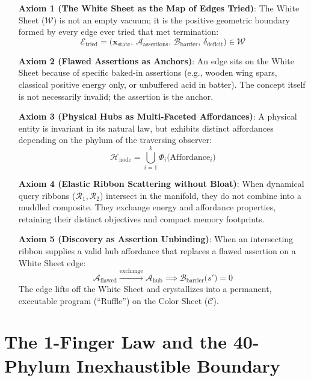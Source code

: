 \documentclass[11pt,a4paper]{article}
\begin{document}
\begin{itemize}
    \item[\textbf{Axiom 1 (The White Sheet as the Map of Edges Tried)}:] The White Sheet ($\mathcal{W}$) is not an empty vacuum; it is the positive geometric boundary formed by every edge ever tried that met termination:
    \begin{equation}
        \mathcal{E}_{\text{tried}} = \big(\mathbf{x}_{\text{state}}, \,\mathcal{A}_{\text{assertions}}, \,\mathcal{B}_{\text{barrier}}, \,\delta_{\text{deficit}}\big) \in \mathcal{W}
    \end{equation}
    \item[\textbf{Axiom 2 (Flawed Assertions as Anchors)}:] An edge sits on the White Sheet because of specific baked-in assertions (e.g., wooden wing spars, classical positive energy only, or unbuffered acid in batter). The concept itself is not necessarily invalid; the assertion is the anchor.
    \item[\textbf{Axiom 3 (Physical Hubs as Multi-Faceted Affordances)}:] A physical entity is invariant in its natural law, but exhibits distinct affordances depending on the phylum of the traversing observer:
    \begin{equation}
        \mathcal{H}_{\text{node}} = \bigcup_{i=1}^k \Phi_i\big(\text{Affordance}_i\big)
    \end{equation}
    \item[\textbf{Axiom 4 (Elastic Ribbon Scattering without Bloat)}:] When dynamical query ribbons ($\mathcal{R}_1, \mathcal{R}_2$) intersect in the manifold, they do not combine into a muddled composite. They exchange energy and affordance properties, retaining their distinct objectives and compact memory footprints.
    \item[\textbf{Axiom 5 (Discovery as Assertion Unbinding)}:] When an intersecting ribbon supplies a valid hub affordance that replaces a flawed assertion on a White Sheet edge:
    \begin{equation}
        \mathcal{A}_{\text{flawed}} \xrightarrow{\text{exchange}} \mathcal{A}_{\text{hub}} \implies \mathcal{B}_{\text{barrier}}\big(s'\big) = 0
    \end{equation}
    The edge lifts off the White Sheet and crystallizes into a permanent, executable program (``Ruffle'') on the Color Sheet ($\mathcal{C}$).
\end{itemize}

\section{The 1-Finger Law and the 40-Phylum Inexhaustible Boundary}
\end{document}
